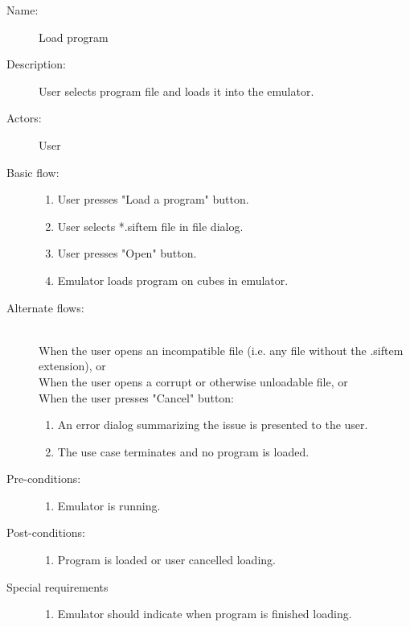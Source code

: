 \documentclass[12pt]{article}
\begin{document}
    \begin{description}
      \item[Name:] Load program
      \item[Description:] User selects program file and loads it into the emulator.
      \item[Actors:] User
      \item[Basic flow:] \hfill 
        \begin{enumerate}
	  \item{User presses "Load a program" button.}
	  \item{User selects *.siftem file in file dialog.}
	  \item{User presses "Open" button.}
	  \item{Emulator loads program on cubes in emulator.}
        \end{enumerate}
      \item[Alternate flows:] \hfill \\
	When the user opens an incompatible file (i.e. any file without the .siftem extension), or \\
	When the user opens a corrupt or otherwise unloadable file, or \\
	When the user presses "Cancel" button:
        \begin{enumerate}
	  \item{An error dialog summarizing the issue is presented to the user.}
	  \item{The use case terminates and no program is loaded.}
        \end{enumerate}
      \item[Pre-conditions:] \hfill
        \begin{enumerate}
          \item{Emulator is running.}
        \end{enumerate}
      \item[Post-conditions:] \hfill
        \begin{enumerate}
	  \item{Program is loaded or user cancelled loading.}
        \end{enumerate}
      \item[Special requirements] \hfill
        \begin{enumerate}
          \item{Emulator should indicate when program is finished loading.}
        \end{enumerate}
    \end{description}
\end{document}
